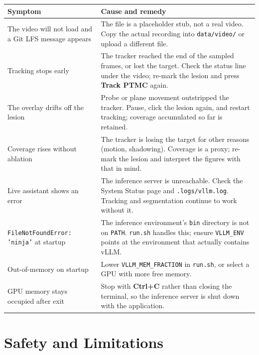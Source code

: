 \documentclass[11pt,a4paper]{article}
\newcommand{\ui}[1]{\textbf{#1}}
\newcommand{\code}[1]{\texttt{\small #1}}
\begin{document}
\begin{longtable}{@{}p{5.2cm}p{9.8cm}@{}}
\toprule
\textbf{Symptom} & \textbf{Cause and remedy} \\
\midrule
\endhead
The video will not load and a Git LFS message appears &
The file is a placeholder stub, not a real video. Copy the actual recording
into \code{data/video/} or upload a different file. \\
\addlinespace
Tracking stops early &
The tracker reached the end of the sampled frames, or lost the target. Check
the status line under the video; re-mark the lesion and press
\ui{Track PTMC} again. \\
\addlinespace
The overlay drifts off the lesion &
Probe or plane movement outstripped the tracker. Pause, click the lesion
again, and restart tracking; coverage accumulated so far is retained. \\
\addlinespace
Coverage rises without ablation &
The tracker is losing the target for other reasons (motion, shadowing).
Coverage is a proxy; re-mark the lesion and interpret the figures with that
in mind. \\
\addlinespace
Live assistant shows an error &
The inference server is unreachable. Check the System Status page and
\code{.logs/vllm.log}. Tracking and segmentation continue to work without
it. \\
\addlinespace
\code{FileNotFoundError: 'ninja'} at startup &
The inference environment's \code{bin} directory is not on \code{PATH}.
\code{run.sh} handles this; ensure \code{VLLM\_ENV} points at the environment
that actually contains vLLM. \\
\addlinespace
Out-of-memory on startup &
Lower \code{VLLM\_MEM\_FRACTION} in \code{run.sh}, or select a GPU with more
free memory. \\
\addlinespace
GPU memory stays occupied after exit &
Stop with \ui{Ctrl+C} rather than closing the terminal, so the inference
server is shut down with the application. \\
\bottomrule
\end{longtable}

\section{Safety and Limitations}
\end{document}
